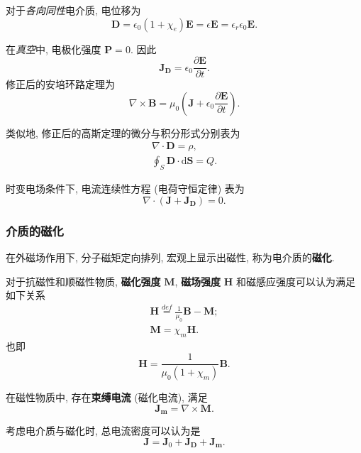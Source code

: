对于\textit{各向同性}电介质, 电位移为
\begin{equation}
    \bm{D}=\epsilon_0(1+\chi_e)\bm{E}=\epsilon\bm{E}=\epsilon_r\epsilon_0\bm{E}.
\end{equation}

在\textit{真空}中, 电极化强度 $\bm{P}=0$. 因此
\begin{equation}
    \bm{J_D}=\epsilon_0\frac{\partial\bm{E}}{\partial t}.
\end{equation}
修正后的安培环路定理为
\begin{equation}
    \nabla\times\bm{B}=\mu_0\left(\bm{J}+\epsilon_0\frac{\partial\bm{E}}{\partial t}\right).
\end{equation}

类似地, 修正后的高斯定理的微分与积分形式分别表为
\begin{gather}
    \nabla\cdot\bm{D}=\rho, \\
    \oint_S\bm{D}\cdot\mathrm{d}\bm{S}=Q.
\end{gather}

时变电场条件下, 电流连续性方程 (电荷守恒定律) 表为
\begin{equation}
    \nabla\cdot(\bm{J}+\bm{J_D})=0.
\end{equation}

\subsubsection{介质的磁化}
在外磁场作用下, 分子磁矩定向排列, 宏观上显示出磁性, 称为电介质的\textbf{磁化}.

对于抗磁性和顺磁性物质, \textbf{磁化强度} $\bm{M}$, \textbf{磁场强度} $\bm{H}$ 和磁感应强度可以认为满足如下关系
\begin{gather}
    \bm{H}\stackrel{def}{=}\frac{1}{\mu_0}\bm{B}-\bm{M}; \\
    \bm{M}=\chi_m\bm{H}.
\end{gather}
也即
\begin{equation}
    \bm{H}=\frac{1}{\mu_0(1+\chi_m)}\bm{B}.
\end{equation}

在磁性物质中, 存在\textbf{束缚电流} (磁化电流), 满足
\begin{equation}
    \bm{J_m}=\nabla\times\bm{M}.
\end{equation}

考虑电介质与磁化时, 总电流密度可以认为是
\begin{equation}
    \bm{J}=\bm{J}_0+\bm{J_D}+\bm{J_m}.
\end{equation}


